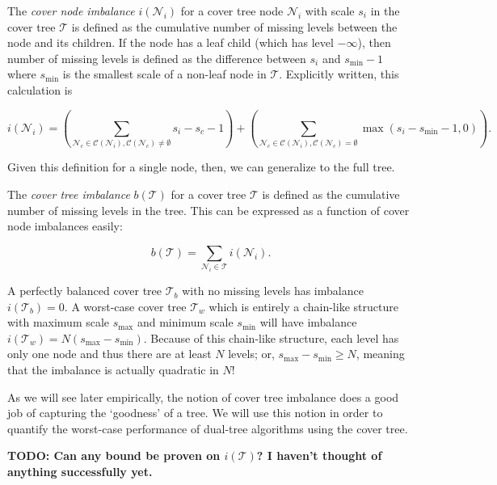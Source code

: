 \begin{defn}
The {\it cover node imbalance} $i(\mathscr{N}_i)$ for a cover tree node
$\mathscr{N}_i$ with scale $s_i$ in the cover tree $\mathscr{T}$ is defined as
the cumulative number of missing levels between the node and its children.  If
the node has a leaf child (which has level $-\infty$), then number of missing
levels is defined as the difference between $s_i$ and $s_{\min} - 1$ where
$s_{\min}$ is the smallest scale of a non-leaf node in $\mathscr{T}$.
Explicitly written, this calculation is

\begin{equation}
i(\mathscr{N}_i) = \left( \sum_{\mathscr{N}_c \in \mathscr{C}(\mathscr{N}_i),
\mathscr{C}(\mathscr{N}_c) \ne \emptyset} s_i - s_c - 1 \right) + \left(
\sum_{\mathscr{N}_c \in \mathscr{C}(\mathscr{N}_i), \mathscr{C}(\mathscr{N}_c) =
\emptyset} \max(s_i - s_{\min} - 1, 0) \right).
\end{equation}
\end{defn}

Given this definition for a single node, then, we can generalize to the full
tree.

\begin{defn}
The {\it cover tree imbalance} $b(\mathscr{T})$ for a cover tree $\mathscr{T}$
is defined as the cumulative number of missing levels in the tree.  This can be
expressed as a function of cover node imbalances easily:

\begin{equation}
b(\mathscr{T}) = \sum_{\mathscr{N}_i \in \mathscr{T}} i(\mathscr{N}_i).
\end{equation}
\end{defn}

A perfectly balanced cover tree $\mathscr{T}_b$ with no missing levels has
imbalance $i(\mathscr{T}_b) = 0$.  A worst-case cover tree $\mathscr{T}_w$ which
is entirely a chain-like structure with maximum scale $s_{\max}$ and minimum
scale $s_{\min}$ will have imbalance $i(\mathscr{T}_w) = N (s_{\max} -
s_{\min})$.  Because of this chain-like structure, each level has only one node
and thus there are at least $N$ levels; or, $s_{\max} - s_{\min} \ge N$, meaning
that the imbalance is actually quadratic in $N$!

As we will see later empirically, the notion of cover tree imbalance does a good
job of capturing the `goodness' of a tree.  We will use this notion in order to
quantify the worst-case performance of dual-tree algorithms using the cover
tree.

{\bf TODO: Can any bound be proven on $i(\mathscr{T})$?  I haven't thought of
anything successfully yet.}
